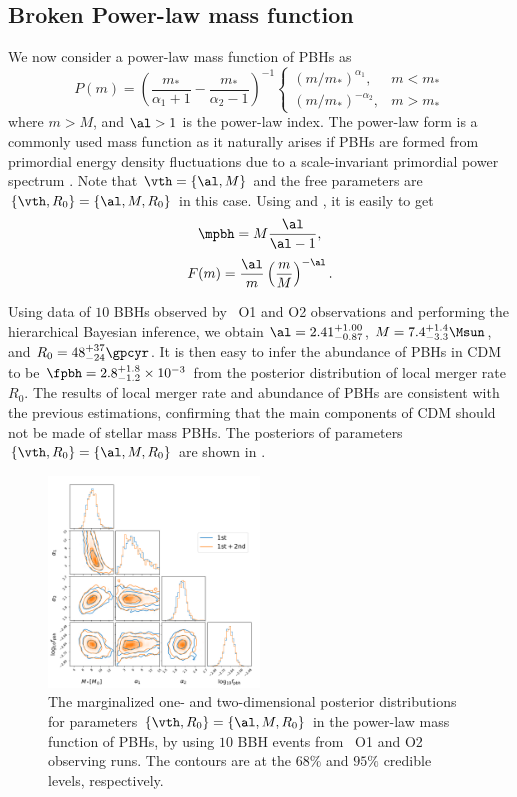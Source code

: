 \documentclass[twocolumn]{aastex631}
\def\({\left(}
\def\){\right)}
\def\e{\begin{equation}}
\def\q{\end{equation}}
\begin{document}
\subsection{Broken Power-law mass function}
We now consider a power-law mass function of PBHs as \cite{Carr:1975qj}
\begin{equation}
	P(m)= \left(\frac{m_*}{\alpha_1+1}-\frac{m_*}{\alpha_2-1}\right)^{-1} \begin{cases}\left(m / m_*\right)^{\alpha_1}, & m<m_* \\ \left(m / m_*\right)^{-\alpha_2}, & m>m_*\end{cases}
\end{equation}
where $m>M$, and $\al>1$ is the power-law index. The power-law form is a commonly used mass function as it naturally arises if PBHs are formed from primordial energy density fluctuations due to a scale-invariant primordial power spectrum \cite{Carr:2016drx,Carr:2017jsz}.
Note that $\vth=\{\al, M\}$ and the free parameters are 
$\{\vth, R_0\} = \{\al, M, R_0\}$ in this case. 
Using  and , it is easily to get
\e
\mpbh = M \frac{\al}{\al-1},
\q
\e 
F(m) = \frac{\al}{m} \(\frac{m}{M}\)^{-\al}.
\q

Using data of $10$ BBHs observed by \lvc\ O1 and O2 observations and performing
the hierarchical Bayesian inference, we obtain $\al = 2.41^{+1.00}_{-0.87}$,
$M = 7.4^{+1.4}_{-3.3} \Msun$, and $R_0 = 48^{+37}_{-24} \gpcyr$.
It is then easy to infer the abundance of PBHs in CDM to be 
$\fpbh = 2.8^{+1.8}_{-1.2} \times 10^{-3}$ from the posterior distribution of local merger rate $R_0$.
The results of local merger rate and abundance of PBHs are consistent with
the previous estimations, confirming that the main components of CDM should
not be made of stellar mass PBHs.
The posteriors of parameters $\{\vth, R_0\} = \{\al, M, R_0\}$ are shown 
in .

\begin{figure}[htbp!]
	\centering
	\includegraphics[width=0.5\textwidth]{post-bpower.pdf}
	\caption{\label{posterior-bpower}
		The marginalized one- and two-dimensional posterior distributions for 
		parameters $\{\vth, R_0\} = \{\al, M, R_0\}$ in the power-law mass function 
		of PBHs, by using $10$ BBH events from \lvc\ O1 and O2 observing runs.
		The contours are at the $68\%$ and $95\%$ credible levels, respectively. 
	}
\end{figure}
\end{document}
